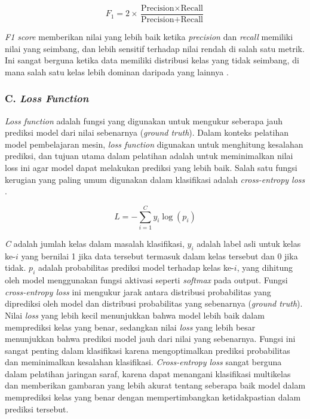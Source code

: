 \begin{equation}
  F_1 = 2 \times \frac{\text{Precision} \times \text{Recall}}{\text{Precision} + \text{Recall}}
\end{equation}

 \emph{F1 score} memberikan nilai yang lebih baik ketika \emph{precision} dan \emph{recall} memiliki nilai yang seimbang, dan lebih sensitif terhadap nilai rendah di salah satu metrik. Ini sangat berguna ketika data memiliki distribusi kelas yang tidak seimbang, di mana salah satu kelas lebih dominan daripada yang lainnya \cite{V7Labs2025}.

\subsubsection{C. \emph{Loss Function}}

\emph{Loss function} adalah fungsi yang digunakan untuk mengukur seberapa jauh prediksi model dari nilai sebenarnya (\emph{ground truth}). Dalam konteks pelatihan model pembelajaran mesin, \emph{loss function} digunakan untuk menghitung kesalahan prediksi, dan tujuan utama dalam pelatihan adalah untuk meminimalkan nilai loss ini agar model dapat melakukan prediksi yang lebih baik. Salah satu fungsi kerugian yang paling umum digunakan dalam klasifikasi adalah \emph{cross-entropy loss} \cite{V7Labs2025}.

\begin{equation}
L = -\sum_{i=1}^{C} y_i \log(p_i)
\end{equation}

\emph{C} adalah jumlah kelas dalam masalah klasifikasi, \( y_i \) adalah label asli untuk kelas ke-\(i\) yang bernilai 1 jika data tersebut termasuk dalam kelas tersebut dan 0 jika tidak. \( p_i \) adalah probabilitas prediksi model terhadap kelas ke-\(i\), yang dihitung oleh model menggunakan fungsi aktivasi seperti \emph{softmax} pada output.   Fungsi \emph{cross-entropy loss} ini mengukur jarak antara distribusi probabilitas yang diprediksi oleh model dan distribusi probabilitas yang sebenarnya (\emph{ground truth}). Nilai \emph{loss} yang lebih kecil menunjukkan bahwa model lebih baik dalam memprediksi kelas yang benar, sedangkan nilai \emph{loss} yang lebih besar menunjukkan bahwa prediksi model jauh dari nilai yang sebenarnya. Fungsi ini sangat penting dalam klasifikasi karena mengoptimalkan prediksi probabilitas dan meminimalkan kesalahan klasifikasi. \emph{Cross-entropy loss} sangat berguna dalam pelatihan jaringan saraf, karena dapat menangani klasifikasi multikelas dan memberikan gambaran yang lebih akurat tentang seberapa baik model dalam memprediksi kelas yang benar dengan mempertimbangkan ketidakpastian dalam prediksi tersebut.



